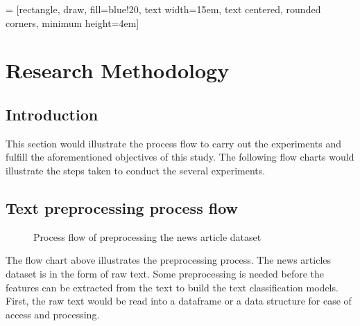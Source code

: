 
 = [rectangle, draw, fill=blue!20, 
text width=15em, text centered, rounded corners, minimum height=4em]


\chapter{Research Methodology}
\section{Introduction}
This section would illustrate the process flow to carry out the experiments and fulfill the aforementioned objectives of this study. The following flow charts would illustrate the steps taken to conduct the several experiments.

\section{Text preprocessing process flow}
\begin{figure} [ht]
\centering
{}
\caption{Process flow of preprocessing the news article dataset}
\label{fig: preprocessFlow}
\end{figure}

The flow chart above illustrates the preprocessing process. The news articles dataset is in the form of raw text. Some preprocessing is needed before the features can be extracted from the text to build the text classification models. First, the raw text would be read into a dataframe or a data structure for ease of access and processing.

